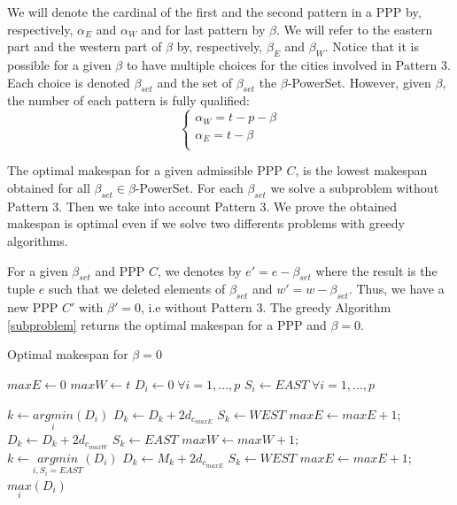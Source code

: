 \documentclass{llncs}
\begin{document}
We will denote the cardinal of the first and the second pattern in a PPP by, respectively, $\alpha_E$ and $\alpha_W$ and for last pattern by $\beta$. We will refer to the eastern part and the western part of $\beta$ by, respectively, $\beta_E$ and $\beta_W$. Notice that it is possible for a given $\beta$ to have multiple choices for the cities involved in Pattern 3. Each choice is denoted $\beta_{set}$ and the set of $\beta_{set}$ the $\beta$-PowerSet. However, given $\beta$, the number of each pattern is fully qualified: 
$$
\left\{
\begin{matrix}
\alpha_W = t-p-\beta \\
\alpha_E = t - \beta \\
\end{matrix}\right.$$



The optimal makespan for a given admissible PPP $C$, is the lowest makespan obtained for all $\beta_{set} \in \beta$-PowerSet. For each $\beta_{set}$ we solve a subproblem without Pattern 3. Then we take into account Pattern 3. We prove the obtained makespan is optimal even if we solve two differents problems with greedy algorithms.

For a given $\beta_{set}$ and PPP $C$, we denotes by $e' = e - \beta_{set}$ where the result is the tuple $e$ such that we deleted elements of $\beta_{set}$ and $w' = w - \beta_{set}$. Thus, we have a new PPP $C'$ with $\beta' = 0$, i.e without Pattern 3. 
The greedy Algorithm \ref{subproblem} returns the optimal makespan for a PPP and $\beta = 0$.

\begin{algorithm}
\caption{\label{subproblem} Optimal makespan for $\beta = 0$}
\begin{algorithmic}
\STATE $maxE \leftarrow 0$
\STATE $maxW \leftarrow t$
\STATE $D_i \leftarrow 0 \; \forall i=1,\ldots,p$
\STATE $S_i \leftarrow EAST \; \forall i=1,\ldots,p$

\STATE $k \leftarrow \underset{i}{argmin}(D_i)$ 
\STATE $D_k \leftarrow D_k + 2d_{c_{maxE}}$
\STATE $S_k \leftarrow WEST$
\STATE $maxE \leftarrow maxE + 1 $;
\ELSE
\STATE $D_k \leftarrow D_k + 2d_{c_{maxW}}$
\STATE $S_k \leftarrow EAST$
\STATE $maxW \leftarrow maxW + 1 $;
\ENDIF
\ENDWHILE
\\
\STATE $k \leftarrow \underset{i, S_i=EAST}{argmin}(D_i)$
\STATE $D_k \leftarrow M_k + 2d_{c_{maxE}}$
\STATE $S_k \leftarrow WEST$
\STATE $maxE \leftarrow maxE + 1 $;
\ENDWHILE
\\
\RETURN $\underset{i}{max}(D_i)$
\end{algorithmic}
\end{algorithm}
\end{document}
